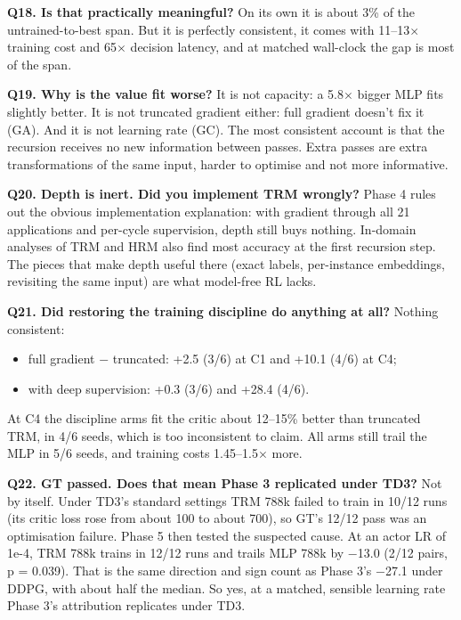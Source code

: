 \documentclass[11pt]{article}
\begin{document}
\textbf{Q18. Is that practically meaningful?} On its own it is about 3\% of the untrained-to-best span. But it is perfectly consistent, it comes with 11--13$\times$ training cost and 65$\times$ decision latency, and at matched wall-clock the gap is most of the span.



\textbf{Q19. Why is the value fit worse?} It is not capacity: a 5.8$\times$ bigger MLP fits slightly better. It is not truncated gradient either: full gradient doesn't fix it (GA). And it is not learning rate (GC). The most consistent account is that the recursion receives no new information between passes. Extra passes are extra transformations of the same input, harder to optimise and not more informative.



\textbf{Q20. Depth is inert. Did you implement TRM wrongly?} Phase 4 rules out the obvious implementation explanation: with gradient through all 21 applications and per-cycle supervision, depth still buys nothing. In-domain analyses of TRM and HRM also find most accuracy at the first recursion step. The pieces that make depth useful there (exact labels, per-instance embeddings, revisiting the same input) are what model-free RL lacks.



\textbf{Q21. Did restoring the training discipline do anything at all?} Nothing consistent:

\begin{itemize}
\item full gradient $-$ truncated: +2.5 (3/6) at C1 and +10.1 (4/6) at C4;
\item with deep supervision: +0.3 (3/6) and +28.4 (4/6).
\end{itemize}



At C4 the discipline arms fit the critic about 12--15\% better than truncated TRM, in 4/6 seeds, which is too inconsistent to claim. All arms still trail the MLP in 5/6 seeds, and training costs 1.45--1.5$\times$ more.



\textbf{Q22. GT passed. Does that mean Phase 3 replicated under TD3?} Not by itself. Under TD3's standard settings TRM 788k failed to train in 10/12 runs (its critic loss rose from about 100 to about 700), so GT's 12/12 pass was an optimisation failure. Phase 5 then tested the suspected cause. At an actor LR of 1e-4, TRM 788k trains in 12/12 runs and trails MLP 788k by $-$13.0 (2/12 pairs, p = 0.039). That is the same direction and sign count as Phase 3's $-$27.1 under DDPG, with about half the median. So yes, at a matched, sensible learning rate Phase 3's attribution replicates under TD3.
\end{document}
